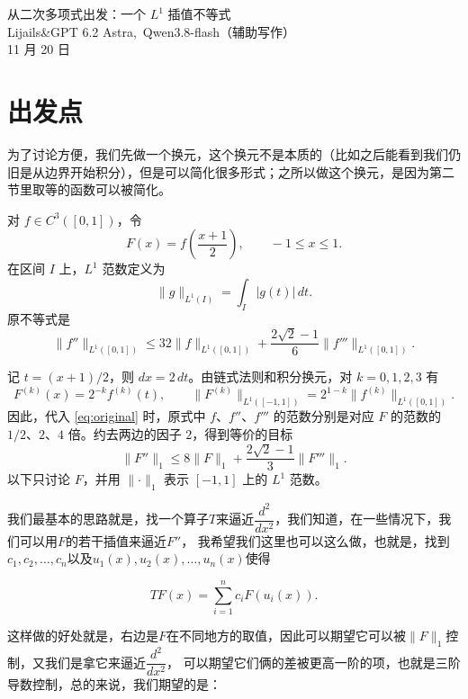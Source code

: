 \documentclass[UTF8,fontset=windows,a4paper,11pt]{ctexart}
\newcommand{\Lone}[1]{\lVert #1\rVert_1}
\begin{document}
\begin{center}
    \Large 从二次多项式出发：一个 $L^1$ 插值不等式\\[6pt]
    \normalsize Lijails\quad \&\quad GPT 6.2 Astra,\ Qwen3.8-flash（辅助写作）\\[2pt]
    11 月 20 日
\end{center}

\section{出发点}

为了讨论方便，我们先做一个换元，这个换元不是本质的（比如之后能看到我们仍旧是从边界开始积分），但是可以简化很多形式；之所以做这个换元，是因为第二节里取等的函数可以被简化。

对 $f\in C^3([0,1])$，令
\[
    F(x)=f\!\left(\frac{x+1}{2}\right),
    \qquad -1\le x\le 1.
\]
在区间 $I$ 上，$L^1$ 范数定义为
\[
    \lVert g\rVert_{L^1(I)}=\int_I |g(t)|\,dt.
\]
原不等式是
\begin{equation}
    \lVert f''\rVert_{L^1([0,1])}
    \le
    32\lVert f\rVert_{L^1([0,1])}
    +\frac{2\sqrt{2}-1}{6}\lVert f'''\rVert_{L^1([0,1])}.
    \label{eq:original}
\end{equation}

记 $t=(x+1)/2$，则 $dx=2\,dt$。由链式法则和积分换元，对 $k=0,1,2,3$ 有
\[
    F^{(k)}(x)=2^{-k}f^{(k)}(t),
    \qquad
    \lVert F^{(k)}\rVert_{L^1([-1,1])}
    =2^{1-k}\lVert f^{(k)}\rVert_{L^1([0,1])}.
\]
因此，代入 \eqref{eq:original} 时，原式中 $f$、$f''$、$f'''$ 的范数分别是对应 $F$ 的范数的 $1/2$、$2$、$4$ 倍。约去两边的因子 $2$，得到等价的目标
\begin{equation}
    \Lone{F''}
    \le 8\Lone{F}
    +\frac{2\sqrt{2}-1}{3}\Lone{F'''}.
    \label{eq:normalized}
\end{equation}
以下只讨论 $F$，并用 $\Lone{\cdot}$ 表示 $[-1,1]$ 上的 $L^1$ 范数。

我们最基本的思路就是，找一个算子$T$来逼近$\dfrac{d^2}{dx^2}$，我们知道，在一些情况下，我们可以用$F$的若干插值来逼近$F''$，
我希望我们这里也可以这么做，也就是，找到$c_1,c_2,\dots,c_n$以及$u_1(x),u_2(x),\dots,u_n(x)$使得

\begin{equation}
    TF(x)=\sum_{i=1}^{n}c_iF(u_i(x)).
\end{equation}

这样做的好处就是，右边是$F$在不同地方的取值，因此可以期望它可以被$\Lone{F}$控制，又我们是拿它来逼近$\dfrac{d^2}{dx^2}$，
可以期望它们俩的差被更高一阶的项，也就是三阶导数控制，总的来说，我们期望的是：
\end{document}
